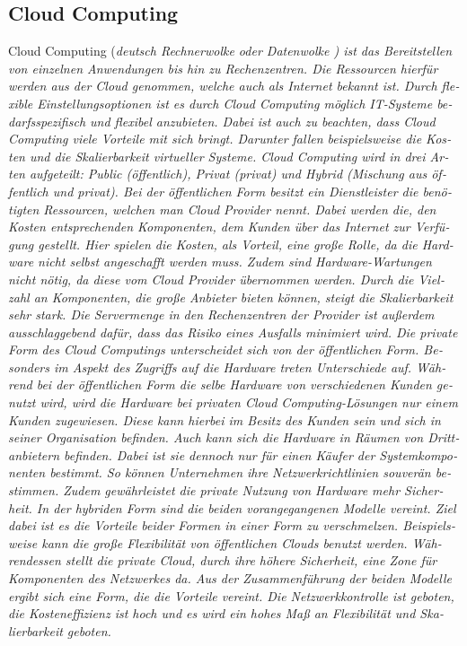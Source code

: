 \begin{otherlanguage}{ngerman}
\subsection{Cloud Computing}
Cloud Computing (\it deutsch Rechnerwolke oder Datenwolke \rm) ist das Bereitstellen von einzelnen Anwendungen bis hin zu Rechenzentren. Die Ressourcen hierfür werden aus der \it Cloud \rm genommen, welche auch als \it Internet \rm bekannt ist. Durch flexible Einstellungsoptionen ist es durch Cloud Computing möglich IT-Systeme bedarfsspezifisch und flexibel anzubieten. Dabei ist auch zu beachten, dass Cloud Computing viele Vorteile mit sich bringt. Darunter fallen beispielsweise die Kosten und die Skalierbarkeit virtueller Systeme. 
\newline 
Cloud Computing wird in drei Arten aufgeteilt: Public (öffentlich), Privat (privat) und Hybrid (Mischung aus öffentlich und privat). Bei der öffentlichen Form besitzt ein Dienstleister die benötigten Ressourcen, welchen man \it Cloud Provider \rm nennt. Dabei werden die, den Kosten entsprechenden Komponenten, dem Kunden über das Internet zur Verfügung gestellt. Hier spielen die Kosten, als Vorteil, eine große Rolle, da die Hardware nicht selbst angeschafft werden muss. Zudem sind Hardware-Wartungen nicht nötig, da diese vom \it Cloud Provider \rm übernommen werden. Durch die Vielzahl an Komponenten, die große Anbieter bieten können, steigt die Skalierbarkeit sehr stark. Die Servermenge in den Rechenzentren der Provider ist außerdem ausschlaggebend dafür, dass das Risiko eines Ausfalls minimiert wird. 
\newline
Die private Form des Cloud Computings unterscheidet sich von der öffentlichen Form. Besonders im Aspekt des Zugriffs auf die Hardware treten Unterschiede auf. Während bei der öffentlichen Form die selbe Hardware von verschiedenen Kunden genutzt wird, wird die Hardware bei privaten Cloud Computing-Lösungen nur einem Kunden zugewiesen. Diese kann hierbei im Besitz des Kunden sein und sich in seiner Organisation befinden. Auch kann sich die Hardware in Räumen von Drittanbietern befinden. Dabei ist sie dennoch nur für einen Käufer der Systemkomponenten bestimmt. So können Unternehmen ihre Netzwerkrichtlinien souverän bestimmen. Zudem gewährleistet die private Nutzung von Hardware mehr Sicherheit. 
\newline
In der hybriden Form sind die beiden vorangegangenen Modelle vereint. Ziel dabei ist es die Vorteile beider Formen in einer Form zu verschmelzen. Beispielsweise kann die große Flexibilität von öffentlichen Clouds benutzt werden. Währendessen stellt die private Cloud, durch ihre höhere Sicherheit, eine Zone für Komponenten des Netzwerkes da. Aus der Zusammenführung der beiden Modelle ergibt sich eine Form, die die Vorteile vereint. Die Netzwerkkontrolle ist geboten, die Kosteneffizienz ist hoch und es wird ein hohes Maß an Flexibilität und Skalierbarkeit geboten. 


\end{otherlanguage}
